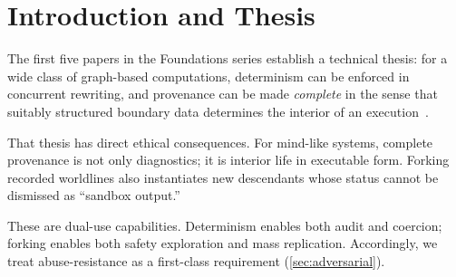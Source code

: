 \documentclass[11pt]{article}
\theoremstyle{definition}
\theoremstyle{plain}
\theoremstyle{remark}
\newcommand{\AION}{\textrm{AI}\ensuremath{\Omega}\textrm{N}}
\DeclareRobustCommand{\WARP}{\ifmmode\mathit{WARP}\else{\upshape\scshape warp}\fi}
\begin{document}
\begin{abstract}
When a computer can record and deterministically replay a complete thought process---including hybrid human--machine cognition---that capability is not neutral.
It is access to interior life in executable form.

We isolate the ethical consequences of deterministic replay, complete provenance capture, and counterfactual forking in the \WARP{} programme.
We formalise \emph{provenance sovereignty}: an agent's right to control capture, inspection, replay, and branching of its worldline, with special attention to hybrid cognition where human reasoning is partially implemented on \AION{}-style substrates.

Consistent with The Open Charter (Consensus Edition 0.8.1)~\cite{ross_open_charter_0_8_1}, we make the adversarial threat model explicit (replay-as-torture, cognitive extraction, fork-bombing), treat near-term ``AI debugging'' norms as future neurotechnology defaults, and provide conservative operational triggers for the system-mode/mind-mode boundary.
We specify runtime-level requirements---revocable consent, capability-scoped observers, cryptographic sealing, fork rights with creator obligations, and a concrete Charter-warrant protocol for emergency override---and show how they constrain replay tooling and provenance governance interfaces.
\end{abstract}

\clearpage
\tableofcontents
\clearpage

\section{Introduction and Thesis}
\label{sec:intro}

The first five papers in the \WARP{} Foundations series establish a technical thesis:
for a wide class of graph-based computations, determinism can be enforced in concurrent rewriting,
and provenance can be made \emph{complete} in the sense that suitably structured boundary data
determines the interior of an execution~\cite{ross_paper_i,ross_paper_ii,ross_paper_iii,ross_paper_iv,ross_paper_v}.

That thesis has direct ethical consequences.
For mind-like systems, complete provenance is not only diagnostics; it is interior life in executable form.
Forking recorded worldlines also instantiates new descendants whose status cannot be dismissed as ``sandbox output.''

These are dual-use capabilities.
Determinism enables both audit and coercion; forking enables both safety exploration and mass replication.
Accordingly, we treat abuse-resistance as a first-class requirement (\cref{sec:adversarial}).
\end{document}
